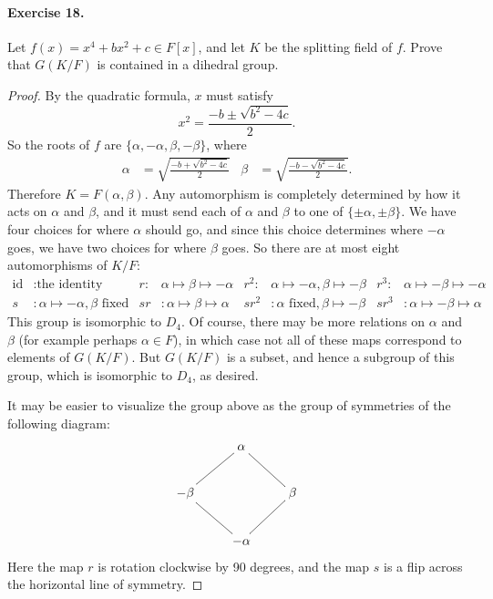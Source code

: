 \documentclass{article}
\begin{document}
\paragraph{Exercise 18.} Let $f(x)=x^4+bx^2+c\in F[x]$, and let $K$ be
the splitting field of $f$. Prove that $G(K/F)$ is contained in a
dihedral group.

\begin{proof}
By the quadratic formula, $x$ must satisfy
$$x^2=\frac{-b\pm \sqrt{b^2-4c}}{2}.$$
So the roots of $f$ are $\{\alpha,-\alpha,\beta,-\beta\}$, where
\begin{align*}
\alpha&=\sqrt{\frac{-b+\sqrt{b^2-4c}}{2}} &
\beta&= \sqrt{\frac{-b-\sqrt{b^2-4c}}{2}}.
\end{align*}
Therefore $K=F(\alpha,\beta)$. Any automorphism is completely
determined by how it acts on $\alpha$ and $\beta$, and it must send
each of $\alpha$ and $\beta$ to one of $\{\pm\alpha,\pm\beta\}$. We
have four choices for where $\alpha$ should go, and since this choice
determines where $-\alpha$ goes, we have two choices for where $\beta$
goes. So there are at most eight automorphisms of $K/F$:
\begin{align*}
\text{id}&:\text{the identity}  &
r:&\alpha\mapsto\beta\mapsto-\alpha &
r^2:&\alpha\mapsto-\alpha, \beta\mapsto-\beta&
r^3:&\alpha\mapsto-\beta\mapsto-\alpha \\
s&:\alpha\mapsto-\alpha,\beta\text{ fixed}&
sr&:\alpha\mapsto \beta\mapsto\alpha&
sr^2&:\alpha\text{ fixed}, \beta\mapsto -\beta&
sr^3&:\alpha\mapsto-\beta\mapsto\alpha
\end{align*}
This group is isomorphic to $D_4$. Of course, there may be more
relations on $\alpha$ and $\beta$ (for example perhaps $\alpha\in F$),
in which case not all of these maps correspond to elements of
$G(K/F)$. But $G(K/F)$ is a subset, and hence a subgroup of this
group, which is isomorphic to $D_4$, as desired.

It may be easier to visualize the group above as the group of
symmetries of the following diagram:
$$\xymatrix{
&\alpha \ar@{-}[dr] \ar@{-}[dl] & \\
-\beta \ar@{-}[dr] &&\beta\ar@{-}[dl]\\
&-\alpha&
}$$
Here the map $r$ is rotation clockwise by 90 degrees, and the map $s$
is a flip across the horizontal line of symmetry.




\end{proof}
\end{document}
